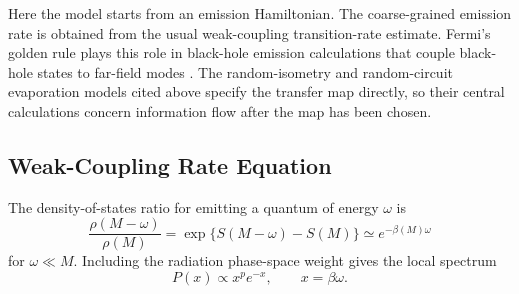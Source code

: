\documentclass[12pt]{article}
\begin{document}
Here the model starts from an emission Hamiltonian.  The coarse-grained
emission rate is obtained from the usual weak-coupling transition-rate
estimate.  Fermi's golden rule plays this role in black-hole emission
calculations that couple black-hole states to far-field modes
\cite{BrownIliesiuPeningtonUsatyuk2026}.
The random-isometry and random-circuit evaporation models cited above specify
the transfer map directly, so their central calculations concern information
flow after the map has been chosen.

\subsection{Weak-Coupling Rate Equation}

The density-of-states ratio for emitting a quantum of energy $\omega$ is
\begin{equation}
    \frac{\rho(M-\omega)}{\rho(M)}
    =
    \exp\{S(M-\omega)-S(M)\}
    \simeq e^{-\beta(M)\omega}
\end{equation}
for $\omega\ll M$.  Including the radiation phase-space weight gives the local
spectrum
\begin{equation}
    P(x)\propto x^p e^{-x},\qquad x=\beta\omega .
\end{equation}
\end{document}
